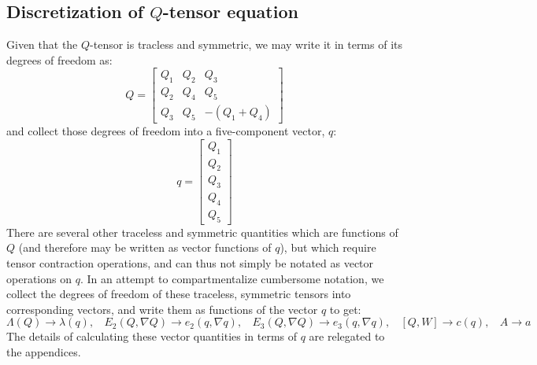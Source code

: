 \documentclass[reqno]{article}
\begin{document}
  \subsection{Discretization of $Q$-tensor equation}
  Given that the $Q$-tensor is tracless and symmetric, we may write it in terms
  of its degrees of freedom as:
  \begin{equation}
    Q
    =
    \begin{bmatrix}
      Q_1 & Q_2 & Q_3 \\
      Q_2 & Q_4 & Q_5 \\
      Q_3 & Q_5 & -(Q_1 + Q_4)
    \end{bmatrix}
  \end{equation}
  and collect those degrees of freedom into a five-component vector, $q$:
  \begin{equation}
    q
    =
    \begin{bmatrix}
      Q_1 \\
      Q_2 \\
      Q_3 \\
      Q_4 \\
      Q_5
    \end{bmatrix}
  \end{equation}
  There are several other traceless and symmetric quantities which are functions
  of $Q$ (and therefore may be written as vector functions of $q$), but which
  require tensor contraction operations, and can thus not simply be notated as
  vector operations on $q$.
  In an attempt to compartmentalize cumbersome notation, we collect the degrees
  of freedom of these traceless, symmetric tensors into corresponding vectors,
  and write them as functions of the vector $q$ to get:
  \begin{equation}
    \Lambda (Q) \to \lambda(q), \:\:\:\:
    E_2(Q, \nabla Q) \to e_2(q, \nabla q), \:\:\:\:
    E_3(Q, \nabla Q) \to e_3(q, \nabla q), \:\:\:\: 
    [Q, W] \to c(q), \:\:\:\:
    A \to a
  \end{equation}
  The details of calculating these vector quantities in terms of $q$ are
  relegated to the appendices.
\end{document}
